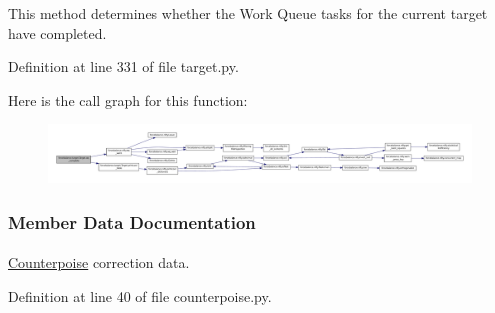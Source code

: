 \-This method determines whether the \-Work \-Queue tasks for the current target have completed. 



\-Definition at line 331 of file target.\-py.



\-Here is the call graph for this function\-:\nopagebreak
\begin{figure}[H]
\begin{center}
\leavevmode
\includegraphics[width=350pt]{classforcebalance_1_1target_1_1Target_af6099ec09486213869dba2491bd8ea04_cgraph}
\end{center}
\end{figure}




\subsubsection{\-Member \-Data \-Documentation}
\hypertarget{classforcebalance_1_1counterpoise_1_1Counterpoise_ae7622f5b81661b6c993fb1eae9b5a2dd}{
\paragraph[{cpqm}]{}}\label{classforcebalance_1_1counterpoise_1_1Counterpoise_ae7622f5b81661b6c993fb1eae9b5a2dd}


\hyperlink{classforcebalance_1_1counterpoise_1_1Counterpoise}{\-Counterpoise} correction data. 



\-Definition at line 40 of file counterpoise.\-py.

\hypertarget{classforcebalance_1_1target_1_1Target_a796dc30a19a60c63fb43b088d40a963f}{
\paragraph[{\-F\-F}]{}}\label{classforcebalance_1_1target_1_1Target_a796dc30a19a60c63fb43b088d40a963f}


